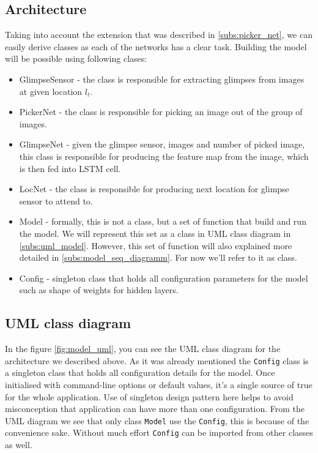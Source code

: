 \subsection{Architecture} \label{subs:arch_model} Taking into account
the extension that was
described in \autoref{subs:picker_net}, we can easily derive classes
as each of the networks has a clear task. Building the model will be
possible using following clases:

\begin{itemize}
	\item GlimpseSensor - the class is responsible for extracting glimpses from
		images at given location $l_t$.
	\item PickerNet - the class is responsible for picking an image out of the
		group of images.
	\item GlimpseNet - given the glimpse sensor, images and number of picked image,
		this class is responsible for producing the feature map from the image,
		which is then fed into LSTM cell.
	\item LocNet - the class is responsible for producing next location for
	glimpse sensor to attend to.
	\item Model - formally, this is not a class, but a set of function that build
		and run the model. We will represent this set as a class in UML class diagram
		in \autoref{subs:uml_model}. However, this set of function will also explained
		more detailed in \autoref{subs:model_seq_diagramm}.
		For now we'll refer to it as class.
	\item Config - singleton class that holds all
		configuration parameters for the model such as shape of weights
		for hidden layers.
\end{itemize}


\subsection{UML class diagram}
\label{subs:uml_model}

In the figure \ref{fig:model_uml}, you can see the UML class diagram for the
architecture we described above. As it was already mentioned the \lstinline{Config}
class is a singleton class that holds all configuration details for the model.
Once initialised with command-line options or default values, it's a single source
of true for the whole application. Use of singleton design pattern here helps
to avoid misconception that application can have more than one configuration.
From the UML diagram we see that only class \lstinline{Model} use the
\lstinline{Config}, this is because of the convenience sake. Without much effort
\lstinline{Config} can be imported from other classes as well.

